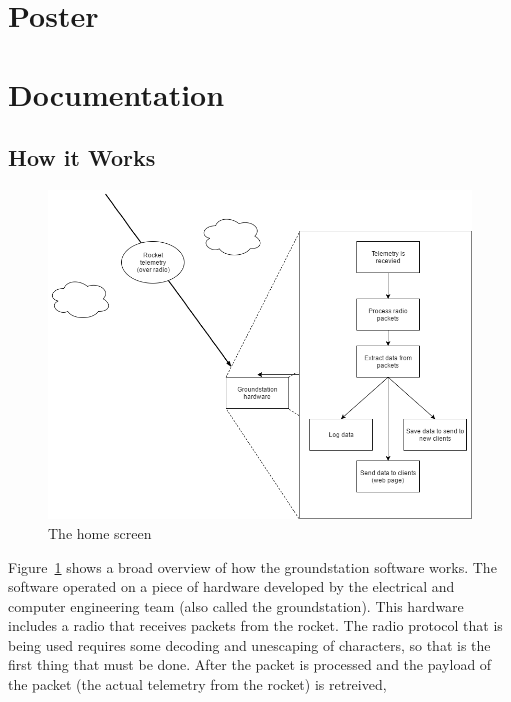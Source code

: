 \documentclass[10pt,draftclsnofoot,onecolumn]{IEEEtran}
\begin{document}
\newpage
\section{Poster}


















\newpage
\section{Documentation}
\subsection{How it Works}
	\begin{figure}[thbp!]
		\centering\includegraphics[width=170mm]{howitworks}
		\caption{The home screen}
		\label{howitworks}
	\end{figure}
Figure~\ref{howitworks} shows a broad overview of how the groundstation software works.
The software operated on a piece of hardware developed by the electrical and computer engineering team (also called the groundstation).
This hardware includes a radio that receives packets from the rocket.
The radio protocol that is being used requires some decoding and unescaping of characters, so that is the
first thing that must be done.
After the packet is processed and the payload of the packet (the actual telemetry from the rocket) is retreived,
\end{document}
